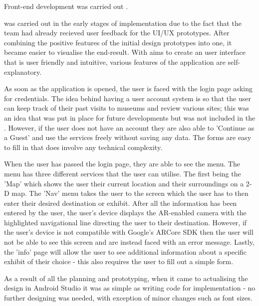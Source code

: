 Front-end development was carried out . 

 was carried out in the early stages of implementation due to the fact that the team had already recieved user feedback for the UI/UX prototypes. After combining the positive features of the initial design prototypes into one, it became easier to visualise the end-result. With aims to create an user interface that is  user friendly and intuitive, various features of the application are self-explanatory. 

As soon as the application is opened, the user is faced with the login page asking for credentials. The idea behind having a user account system is so that the user can keep track of their past visits to museums and review various sites; this was an idea that was put in place for future developments but was not included in the . However, if the user does not have an account they are also able to 'Continue as a Guest' and use the services freely without saving any data. The forms are easy to fill in  that does involve any technical complexity.

When the user has passed the login page, they are able to see the menu. The menu has three different services that the user can utilise. The first being the 'Map' which shows the user their current location and their surroundings on a 2-D map. The 'Nav' menu takes the user to the screen which the user has to then enter their desired destination or exhibit. After all the information has been entered by the user, the user's device displays the AR-enabled camera with the highlighted navigational line directing the user to their destination. However, if the user's device is not compatible with Google's ARCore SDK then the user will not be able to see this screen and are instead faced with an error message. Lastly, the 'info' page will allow the user to see additional information about a specific exhibit of their choice - this also requires the user to fill out a simple form.

As a result of all the planning and prototyping, when it came to actualising the design in Android Studio it was as simple as writing code for implementation - no further designing was needed, with exception of minor changes such as font sizes.


